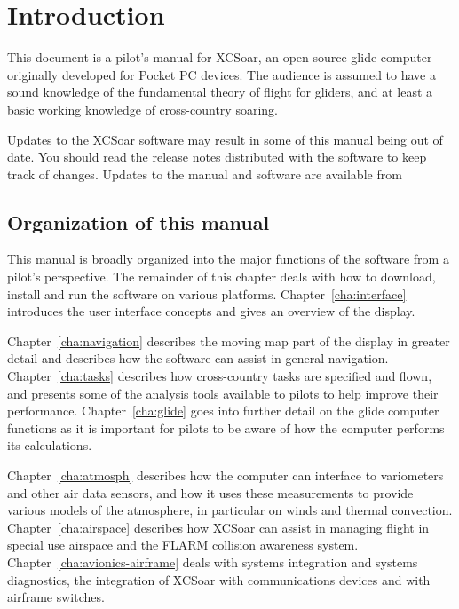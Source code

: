 \chapter{Introduction}\label{cha:introduction}
This document is a pilot's manual for XCSoar, an open-source glide
computer originally developed for Pocket PC devices.  The audience 
is assumed to have a sound knowledge of the fundamental theory of flight for
gliders, and at least a basic working knowledge of cross-country soaring.

Updates to the XCSoar software may result in some of this manual being
out of date. You should read the release notes distributed with the
software to keep track of changes.  Updates to the manual and software
are available from 
\begin{quote}
\end{quote}

\section{Organization of this manual}

This manual is broadly
organized into the major functions of the software from a pilot's perspective.  The remainder of this chapter
deals with how to download, install and run the software on various
platforms.  Chapter~\ref{cha:interface} introduces the user interface
concepts and gives an overview of the display.

Chapter~\ref{cha:navigation} describes the moving map part of the
display in greater detail and describes how the software can assist in
general navigation.  Chapter~\ref{cha:tasks} describes how
cross-country tasks are specified and flown, and presents some of the
analysis tools available to pilots to help improve their performance.
Chapter~\ref{cha:glide} goes into further detail on the glide computer
functions as it is important for pilots to be aware of how the
computer performs its calculations.

Chapter~\ref{cha:atmosph} describes how the computer can interface to
variometers and other air data sensors, and how it uses these
measurements to provide various models of the atmosphere, in
particular on winds and thermal convection.
Chapter~\ref{cha:airspace} describes how XCSoar can assist in managing
flight in special use airspace and the FLARM collision awareness
system.  Chapter~\ref{cha:avionics-airframe} deals with systems
integration and systems diagnostics, the integration of XCSoar with
communications devices and with airframe switches.

